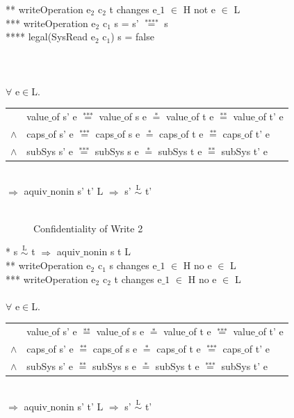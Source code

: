 \documentclass[pdftex,11pt,a4paper]{article}
\begin{document}
** writeOperation e$_2$ c$_2$ t changes e$\_1$ $\in$ H not e $\in$ L \\
*** writeOperation e$_2$ c$_1$ s = s' $\overset{\text{****}}{=}$ s \\
**** legal(SysRead e$_2$ c$_1$) s = false \\ \\ \\ \\
$\forall$ e$\in$L. \\ 
\begin{tabular}{ll}
& value$\_$of s' e $\overset{\text{***}}{=}$ value$\_$of s e $\overset{\text{*}}{=}$ value$\_$of t e $\overset{\text{**}}{=}$ value$\_$of t' e \\
$\wedge$ & caps$\_$of s' e $\overset{\text{***}}{=}$ caps$\_$of s e $\overset{\text{*}}{=}$ caps$\_$of t e $\overset{\text{**}}{=}$ caps$\_$of t' e \\
$\wedge$ & subSys s' e $\overset{\text{***}}{=}$ subSys s e $\overset{\text{*}}{=}$ subSys t e $\overset{\text{**}}{=}$ subSys t' e
\end{tabular} \\
$\Rightarrow$ aquiv$\_$nonin s' t' L $\Rightarrow$ s' $\overset{\text{L}}{\sim}$ t' \\ \\
\begin{figure}[H]
\caption{Confidentiality of Write 2}
\end{figure}
* s $\overset{\text{L}}{\sim}$ t $\Rightarrow$ aquiv$\_$nonin s t L	\\ 
** writeOperation e$_2$ c$_1$ s changes e$\_1$ $\in$ H no e $\in$ L \\ 
*** writeOperation e$_2$ c$_2$ t changes e$\_1$ $\in$ H no e $\in$ L \\ \\
$\forall$ e$\in$L. \\
\begin{tabular}{ll}
& value$\_$of s' e $\overset{\text{**}}{=}$ value$\_$of s e $\overset{\text{*}}{=}$ value$\_$of t e $\overset{\text{***}}{=}$ value$\_$of t' e \\
$\wedge$ & caps$\_$of s' e $\overset{\text{**}}{=}$ caps$\_$of s e $\overset{\text{*}}{=}$ caps$\_$of t e $\overset{\text{***}}{=}$ caps$\_$of t' e \\
$\wedge$ & subSys s' e $\overset{\text{**}}{=}$ subSys s e $\overset{\text{*}}{=}$ subSys t e $\overset{\text{***}}{=}$ subSys t' e
\end{tabular} \\
$\Rightarrow$ aquiv$\_$nonin s' t' L $\Rightarrow$ s' $\overset{\text{L}}{\sim}$ t'
\end{document}
